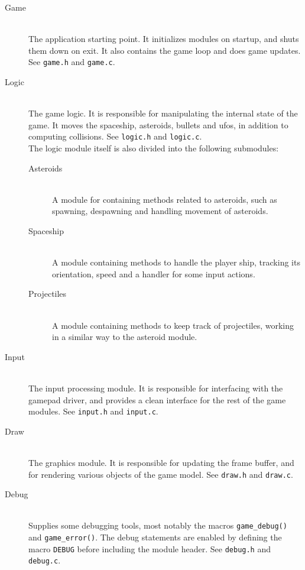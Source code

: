\begin{description}
\item[Game] \hfill \\
The application starting point. It initializes modules on startup, and shuts them down on exit. It also contains the game loop and does game updates. See \texttt{game.h} and \texttt{game.c}.

\item[Logic] \hfill \\
The game logic. It is responsible for manipulating the internal state of the game. It moves the spaceship, asteroids, bullets and ufos, in addition to computing collisions. See \texttt{logic.h} and \texttt{logic.c}. \\
The logic module itself is also divided into the following submodules:
\begin{description}
\item[Asteroids] \hfill \\ 
A module for containing methods related to asteroids, such as spawning, despawning and handling movement of asteroids.

\item[Spaceship] \hfill \\
A module containing methods to handle the player ship, tracking its orientation, speed and a handler for some input actions.

\item[Projectiles] \hfill \\
A module containing methods to keep track of projectiles, working in a similar way to the asteroid module.  
\end{description}

\item[Input] \hfill \\
The input processing module. It is responsible for interfacing with the gamepad driver, and provides a clean interface for the rest of the game modules. See \texttt{input.h} and \texttt{input.c}.

\item[Draw] \hfill \\
The graphics module. It is responsible for updating the frame buffer, and for rendering various objects of the game model. See \texttt{draw.h} and \texttt{draw.c}.

\item[Debug] \hfill \\
Supplies some debugging tools, most notably the macros \texttt{game\_debug()} and \texttt{game\_error()}. The debug statements are enabled by defining the macro \texttt{DEBUG} before including the module header. See \texttt{debug.h} and \texttt{debug.c}.
\end{description}

